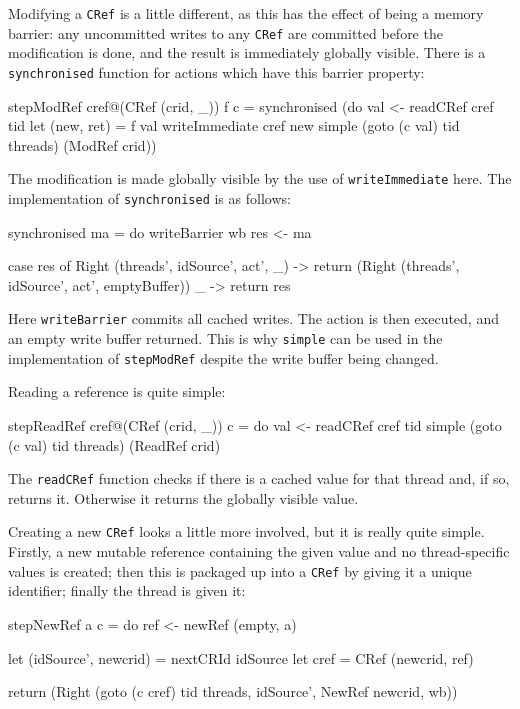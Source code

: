 Modifying a \verb|CRef| is a little different, as this has the effect
of being a memory barrier: any uncommitted writes to any \verb|CRef|
are committed before the modification is done, and the result is
immediately globally visible. There is a \verb|synchronised| function
for actions which have this barrier property:

\begin{haskellcode}
stepModRef cref@(CRef (crid, _)) f c = synchronised (do
  val <- readCRef cref tid
  let (new, ret) = f val
  writeImmediate cref new
  simple (goto (c val) tid threads) (ModRef crid))
\end{haskellcode}

The modification is made globally visible by the use of
\verb|writeImmediate| here. The implementation of \verb|synchronised|
is as follows:

\begin{haskellcode}
synchronised ma = do
  writeBarrier wb
  res <- ma

  case res of
    Right (threads', idSource', act', _) -> return
      (Right (threads', idSource', act', emptyBuffer))
    _ -> return res
\end{haskellcode}

Here \verb|writeBarrier| commits all cached writes. The action is then
executed, and an empty write buffer returned. This is why
\verb|simple| can be used in the implementation of \verb|stepModRef|
despite the write buffer being changed.

Reading a reference is quite simple:

\begin{haskellcode}
stepReadRef cref@(CRef (crid, _)) c = do
  val <- readCRef cref tid
  simple (goto (c val) tid threads) (ReadRef crid)
\end{haskellcode}

The \verb|readCRef| function checks if there is a cached value for
that thread and, if so, returns it. Otherwise it returns the globally
visible value.

Creating a new \verb|CRef| looks a little more involved, but it is
really quite simple. Firstly, a new mutable reference containing the
given value and no thread-specific values is created; then this is
packaged up into a \verb|CRef| by giving it a unique identifier;
finally the thread is given it:

\begin{haskellcode}
stepNewRef a c = do
  ref <- newRef (empty, a)

  let (idSource', newcrid) = nextCRId idSource
  let cref = CRef (newcrid, ref)

  return (Right
    (goto (c cref) tid threads, idSource', NewRef newcrid, wb))
\end{haskellcode}

